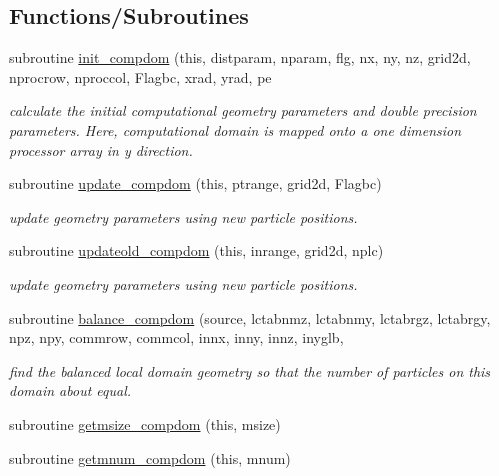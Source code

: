 \subsection*{Functions/\+Subroutines}
\begin{DoxyCompactItemize}
\item 
subroutine \mbox{\hyperlink{namespacecompdomclass_acdfdc48f4091ad70b76c1c7ed66c10b0}{init\+\_\+compdom}} (this, distparam, nparam, flg, nx, ny, nz, grid2d, nprocrow, nproccol, Flagbc, xrad, yrad, pe
\begin{DoxyCompactList}\small\item\em calculate the initial computational geometry parameters and double precision parameters. Here, computational domain is mapped onto a one dimension processor array in y direction. \end{DoxyCompactList}\item 
subroutine \mbox{\hyperlink{namespacecompdomclass_a0e7d562b378f77e0d3a14b33168cb46b}{update\+\_\+compdom}} (this, ptrange, grid2d, Flagbc)
\begin{DoxyCompactList}\small\item\em update geometry parameters using new particle positions. \end{DoxyCompactList}\item 
subroutine \mbox{\hyperlink{namespacecompdomclass_abf3eab7526c06e30b574ddf8be378826}{updateold\+\_\+compdom}} (this, inrange, grid2d, nplc)
\begin{DoxyCompactList}\small\item\em update geometry parameters using new particle positions. \end{DoxyCompactList}\item 
subroutine \mbox{\hyperlink{namespacecompdomclass_a024b1cbd7d29d1bd2ac4285c45b25cb1}{balance\+\_\+compdom}} (source, lctabnmz, lctabnmy, lctabrgz, lctabrgy, npz, npy, commrow, commcol, innx, inny, innz, inyglb,
\begin{DoxyCompactList}\small\item\em find the balanced local domain geometry so that the number of particles on this domain about equal. \end{DoxyCompactList}\item 
subroutine \mbox{\hyperlink{namespacecompdomclass_a460a22916802ee9041aa66d1922cb812}{getmsize\+\_\+compdom}} (this, msize)
\item 
subroutine \mbox{\hyperlink{namespacecompdomclass_a4742fe5698151e1e31e2261798a433c8}{getmnum\+\_\+compdom}} (this, mnum)
\item 

\end{DoxyCompactItemize}
